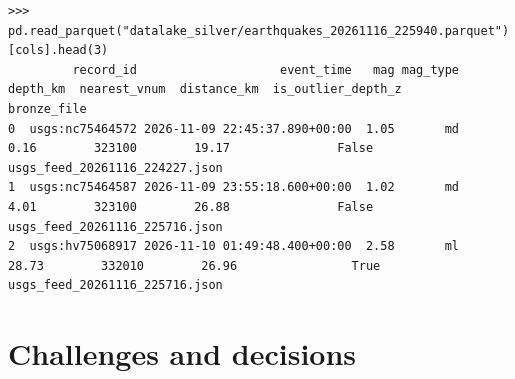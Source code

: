 \documentclass[11pt,a4paper]{article}
\begin{document}
\begin{lstlisting}[basicstyle=\tiny\ttfamily, caption={Sample Silver Parquet output (\texttt{earthquakes\_20261116\_225940.parquet}) read with pandas, showing normalized UTC timestamps, spatial join to the nearest volcano, outlier flags, and Bronze file lineage.}]
>>> pd.read_parquet("datalake_silver/earthquakes_20261116_225940.parquet")[cols].head(3)
         record_id                    event_time   mag mag_type  depth_km  nearest_vnum  distance_km  is_outlier_depth_z                     bronze_file
0  usgs:nc75464572 2026-11-09 22:45:37.890+00:00  1.05       md      0.16        323100        19.17               False  usgs_feed_20261116_224227.json
1  usgs:nc75464587 2026-11-09 23:55:18.600+00:00  1.02       md      4.01        323100        26.88               False  usgs_feed_20261116_225716.json
2  usgs:hv75068917 2026-11-10 01:49:48.400+00:00  2.58       ml     28.73        332010        26.96                True  usgs_feed_20261116_225716.json
\end{lstlisting}

\section{Challenges and decisions}
\end{document}

